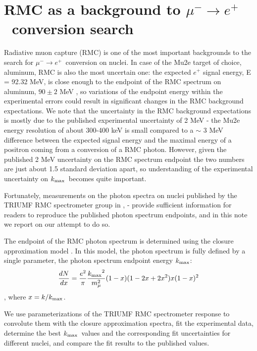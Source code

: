 \documentclass[12pt]{article}
\newcommand {\kmax}         {\mbox{$k_{\rm max}$}}
\newcommand {\MuMinusEPlus} {\mbox{$\mu^- \rightarrow e^+$}}
\begin{document}
\section{ RMC as a background to \MuMinusEPlus\ conversion search }
% 
% 

Radiative muon capture (RMC) is one of the most important backgrounds to the search for
\MuMinusEPlus\ conversion on nuclei. In case of the Mu2e target of choice, aluminum,
RMC is also the most uncertain one: the expected $e^+$ signal energy, E = 92.32 MeV,
is close enough to the endpoint of the RMC spectrum on aluminum,
$90 \pm 2$ MeV \cite{RMC_1999_PhysRevC.59.2853}, so variations of the endpoint
energy within the experimental errors could result in significant changes
in the RMC background expectations.
%
We note that the uncertainty in the RMC background expectations is mostly due to the
published experimental uncertainty of 2 MeV - the Mu2e energy resolution of about 300-400 keV
is small compared to a $\sim$ 3 MeV difference between the expected signal energy
and the maximal energy of a positron coming from a conversion of a RMC photon.
However, given the published 2 MeV uncertainty on the RMC spectrum endpoint the two 
numbers are just about 1.5 standard deviation apart, so understanding of the
experimental uncertainty on \kmax\ becomes quite important.

Fortunately, measurements on the photon spectra on nuclei published 
by the TRIUMF RMC spectrometer group in \cite{RMC_1992_PhysRevC.46.1094},
\cite{RMC_1999_PhysRevC.59.2853} - provide sufficient information for readers
to reproduce the published photon spectrum endpoints, and in this note
we report on our attempt to do so.

The endpoint of the RMC photon spectrum is determined using the closure
approximation model \cite{RMC_1979_CERN_REF-TH-2967}.
In this model, the photon spectrum is fully defined by a single parameter,
the photon spectrum endpoint energy \kmax:
$$
   {dN \over dx} = {e^2 \over \pi} {\kmax^2 \over {m_\mu^2}}  (1-x) (1-2x+2x^2) x (1-x)^2
$$
, where $x = k/\kmax$.

We use parameterizations of the TRIUMF RMC spectrometer response
to convolute them with the closure approximation spectra, fit the experimental data,
determine the best \kmax\ values and the corresponding fit uncertainties
for different nuclei, and compare the fit results to the published values.
\end{document}

